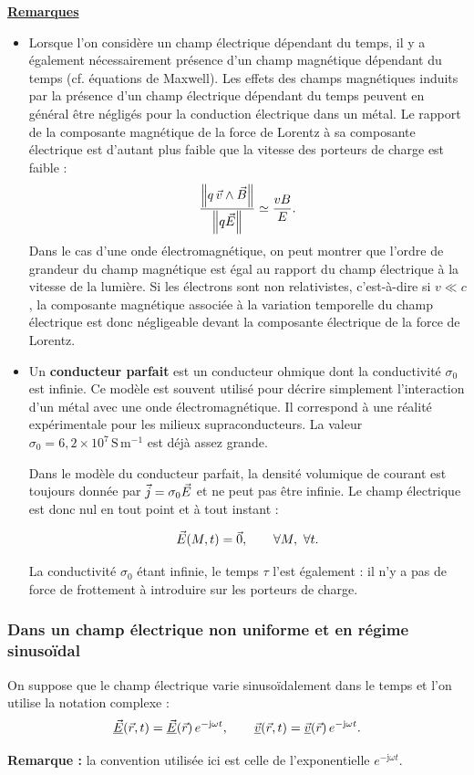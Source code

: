 \documentclass[11pt,a4paper]{article}
\newif\ifinexample
\newcommand{\vv}{\vec v}
\newcommand{\titr}[1]{\par\ifinexample\else\Needspace{4\baselineskip}\fi\textbf{\underline{#1}}\par\nopagebreak[3]}
\newcommand{\vj}{\vec j}\newcommand{\vE}{\vec E}\newcommand{\vB}{\vec B}
\newcommand{\vzero}{\vec 0}
\newcommand{\cx}[1]{\underline{#1}}
\newcommand{\norme}[1]{\left\lVert #1\right\rVert}
\newcommand{\imag}{\mathrm{j}}
\newcommand{\remaq}{\par\textbf{Remarque :} }
\newcommand{\bmath}[1]{\begin{cadre}\[#1\]\end{cadre}}
\newcommand{\unite}[1]{\,\mathrm{#1}}
\begin{document}
\titr{Remarques}
\begin{itemize}
\item Lorsque l'on considère un champ électrique dépendant du temps, il y a également
nécessairement présence d'un champ magnétique dépendant du temps (cf. équations de Maxwell).\label{verif:variable}
Les effets des champs magnétiques induits par la présence d'un champ électrique dépendant
du temps peuvent en général être négligés pour la conduction électrique dans un métal.
Le rapport de la composante magnétique de la force de Lorentz à sa composante électrique est
d'autant plus faible que la vitesse des porteurs de charge est faible :
\[
 \frac{\norme{q\,\vv\wedge\vB}}{\norme{q\E}}\simeq\frac{vB}{E}.
\]
Dans le cas d'une onde électromagnétique, on peut montrer que l'ordre de grandeur du champ
magnétique est égal au rapport du champ électrique à la vitesse de la lumière.
Si les électrons sont non relativistes, c'est-à-dire si \(v\ll c\), la composante magnétique
associée à la variation temporelle du champ électrique est donc négligeable devant la
composante électrique de la force de Lorentz.
\item Un \textbf{conducteur parfait} est un conducteur ohmique dont la conductivité
\(\sigma_0\) est infinie. Ce modèle est souvent utilisé pour décrire simplement l'interaction
d'un métal avec une onde électromagnétique. Il correspond à une réalité expérimentale pour les
milieux supraconducteurs. La valeur \(\sigma_0=6{,}2\times10^7\unite{S\,m^{-1}}\) est déjà
assez grande.

Dans le modèle du conducteur parfait, la densité volumique de courant est toujours donnée
par \(\vj=\sigma_0\E\) et ne peut pas être infinie. Le champ électrique est donc nul
en tout point et à tout instant :
\bmath{\E(M,t)=\vzero,\qquad\forall M,\ \forall t.}
La conductivité \(\sigma_0\) étant infinie, le temps \(\tau\) l'est également : il n'y a
pas de force de frottement à introduire sur les porteurs de charge.
\end{itemize}

\subsubsection{Dans un champ électrique non uniforme et en régime sinusoïdal}\label{sec:sinus}
On suppose que le champ électrique varie sinusoïdalement dans le temps et l'on utilise la
notation complexe :
\[
 \cx{\E}(\vec r,t)=\cx{\E}(\vec r)\,e^{-\imag\omega t},
 \qquad
 \cx{\vv}(\vec r,t)=\cx{\vv}(\vec r)\,e^{-\imag\omega t}.
\]
\remaq la convention utilisée ici est celle de l'exponentielle \(e^{-\imag\omega t}\).
\end{document}
